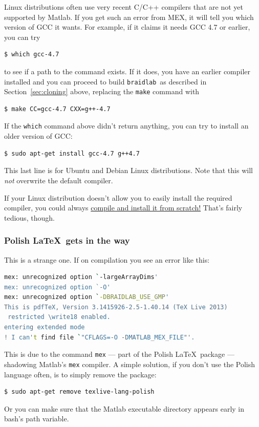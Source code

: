 \documentclass[12pt]{article}
\newcommand{\braidlab}{\texttt{braidlab}}%
\begin{document}
Linux distributions often use very recent C/C++ compilers that are not yet
supported by Matlab.  If you get such an error from MEX, it will tell you
which version of GCC it wants.  For example, if it claims it needs GCC 4.7 or
earlier, you can try
\begin{lstlisting}[frame=single,framerule=0pt,escapechar=*,%
  language=bash,backgroundcolor=\color{white}]
$ which gcc-4.7
\end{lstlisting}
to see if a path to the command exists.  If it does, you have an earlier
compiler installed and you can proceed to build \braidlab\ as described in
Section~\ref{sec:cloning} above, replacing the \lstinline{make} command with
\begin{lstlisting}[frame=single,framerule=0pt,escapechar=*,%
  language=bash,backgroundcolor=\color{white}]
$ make CC=gcc-4.7 CXX=g++-4.7
\end{lstlisting}

If the \lstinline{which} command above didn't return anything, you can try to
install an older version of GCC:
\begin{lstlisting}[frame=single,framerule=0pt,escapechar=*,%
  language=bash,backgroundcolor=\color{white}]
$ sudo apt-get install gcc-4.7 g++4.7
\end{lstlisting}
This last line is for Ubuntu and Debian Linux distributions.  Note that this
will \emph{not} overwrite the default compiler.

If your Linux distribution doesn't allow you to easily install the required
compiler, you could always \href{https://gcc.gnu.org/releases.html}{compile
  and install it from scratch!}  That's fairly tedious, though.


\subsubsection{Polish \LaTeX\ gets in the way}

This is a strange one.  If on compilation you see an error like this:
\begin{lstlisting}[frame=single,framerule=0pt,escapechar=*,%
  language=bash,backgroundcolor=\color{white}]
mex: unrecognized option `-largeArrayDims'
mex: unrecognized option `-O'
mex: unrecognized option `-DBRAIDLAB_USE_GMP'
This is pdfTeX, Version 3.1415926-2.5-1.40.14 (TeX Live 2013)
 restricted \write18 enabled.
entering extended mode
! I can't find file `"CFLAGS=-O -DMATLAB_MEX_FILE"'.
\end{lstlisting}
This is due to the command \lstinline{mex} --- part of the Polish \LaTeX\
package --- shadowing Matlab's \lstinline{mex} compiler.  A simple solution,
if you don't use the Polish language often, is to simply remove the package:
\begin{lstlisting}[frame=single,framerule=0pt,escapechar=*,%
  language=bash,backgroundcolor=\color{white}]
$ sudo apt-get remove texlive-lang-polish
\end{lstlisting}
Or you can make sure that the Matlab executable directory appears early in
bash's path variable.
\end{document}
